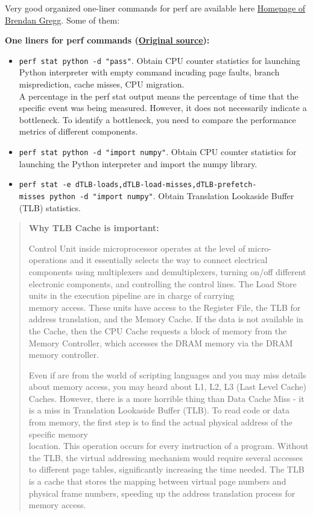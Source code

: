 \documentclass[
]{article}
\begin{document}
Very good organized one-liner commands for perf are available here
\href{https://www.brendangregg.com/perf.html}{Homepage of Brendan
Gregg}. Some of them:

\textbf{One liners for perf commands
(\href{https://www.brendangregg.com/perf.html\#OneLiners}{Original
source}):}

\begin{itemize}
\item
  \texttt{perf\ stat\ python\ -d\ "pass"}. Obtain CPU counter statistics
  for launching Python interpreter with empty command incuding page
  faults, branch misprediction, cache misses, CPU migration.\\
  A percentage in the perf stat output means the percentage of time that
  the specific event was being measured. However, it does not
  necessarily indicate a bottleneck. To identify a bottleneck, you need
  to compare the performance metrics of different components.
\item
  \texttt{perf\ stat\ python\ -d\ "import\ numpy"}. Obtain CPU counter
  statistics for launching the Python interpreter and import the numpy
  library.
\item
  \texttt{perf\ stat\ -e\ dTLB-loads,dTLB-load-misses,dTLB-prefetch-misses\ python\ -d\ "import\ numpy"}.
  Obtain Translation Lookaside Buffer (TLB) statistics.
\end{itemize}

\begin{quote}
\textbf{Why TLB Cache is important:}

Control Unit inside microprocessor operates at the level of
micro-operations and it essentially selects the way to connect
electrical components using multiplexers and demultiplexers, turning
on/off different electronic components, and controlling the control
lines. The Load Store units in the execution pipeline are in charge of
carrying \\
memory access. These units have access to the Register File, the TLB for
address translation, and the Memory Cache. If the data is not available
in the Cache, then the CPU Cache requests a block of memory from the
Memory Controller, which accesses the DRAM memory via the DRAM memory
controller.

Even if are from the world of scripting languages and you may miss
details about memory access, you may heard about L1, L2, L3 (Last Level
Cache) Caches. However, there is a more horrible thing than Data Cache
Miss - it is a miss in Translation Lookaside Buffer (TLB). To read code
or data from memory, the first step is to find the actual physical
address of the specific memory\\
location. This operation occurs for every instruction of a program.
Without the TLB, the virtual addressing mechanism would require several
accesses to different page tables, significantly increasing the time
needed. The TLB is a cache that stores the mapping between virtual page
numbers and physical frame numbers, speeding up the address translation
process for memory access.
\end{quote}
\end{document}
